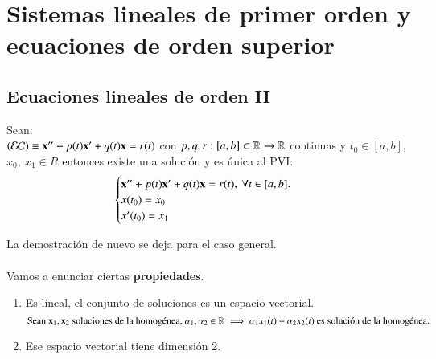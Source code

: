 
\chapter{Sistemas lineales de primer orden y ecuaciones de orden superior}
\section{Ecuaciones lineales de orden II}

\begin{thm}\label{thm:exist-unic-ii}
    Sean: \\$(\mathcal{EC}) \equiv \mathbf{x}'' + p(t)\mathbf{x}' + q(t) \mathbf{x} = r(t)$ con $p, q, r: [a, b] \subset \mathbb{R} \to \mathbb{R}$ continuas y $t_0 \in [a, b]$, $x_0,\ x_1 \in R$ entonces existe una solución y es única al PVI:
    $$
        \begin{cases}
            \mathbf{x}'' + p(t)\mathbf{x}' + q(t)\mathbf{x} = r(t),\ \forall t \in [a, b].\\
            x(t_0) = x_0\\
            x'(t_0) = x_1\\
        \end{cases}
    $$
\end{thm}
La demostración de nuevo se deja para el caso general.\\\\
Vamos a enunciar ciertas \textbf{propiedades}.
\begin{enumerate} \label{properties:ecua-lin-ii}
    \item Es lineal, el conjunto de soluciones es un espacio vectorial.
    $$
        \text{Sean } \mathbf{x}_1, \mathbf{x}_2 \text{ soluciones de la homogénea, } \alpha_1, \alpha_2 \in \mathbb{R} \implies \alpha_1 x_1(t) + \alpha_2 x_2(t) \text{ es solución de la homogénea.}
    $$
    \item Ese espacio vectorial tiene dimensión 2.
\end{enumerate}
